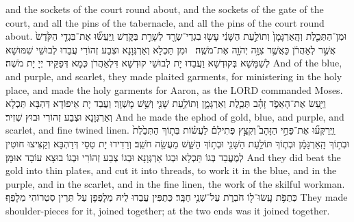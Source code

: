 {{and the sockets of the court round about, and the sockets of the gate of the court, and all the pins of the tabernacle, and all the pins of the court round about.}{}
\newperek
{}%
{וּמִן־הַתְּכֵ֤לֶת וְהָֽאַרְגָּמָן֙ וְתוֹלַ֣עַת הַשָּׁנִ֔י עָשׂ֥וּ בִגְדֵי־שְׂרָ֖ד לְשָׁרֵ֣ת בַּקֹּ֑דֶשׁ וַֽיַּעֲשׂ֞וּ אֶת־בִּגְדֵ֤י הַקֹּ֙דֶשׁ֙ אֲשֶׁ֣ר לְאַהֲרֹ֔ן כַּאֲשֶׁ֛ר צִוָּ֥ה יְהֹוָ֖ה אֶת־מֹשֶֽׁה׃ \petucha 
{}}
{וּמִן תַּכְלָא וְאַרְגְּוָנָא וּצְבַע זְהוֹרִי עֲבַדוּ לְבוּשֵׁי שִׁמּוּשָׁא לְשַׁמָּשָׁא בְּקוּדְשָׁא וַעֲבַדוּ יָת לְבוּשֵׁי קוּדְשָׁא דִּלְאַהֲרֹן כְּמָא דְּפַקֵּיד יְיָ יָת מֹשֶׁה׃}
{And of the blue, and purple, and scarlet, they made plaited garments, for ministering in the holy place, and made the holy garments for Aaron, as the LORD commanded Moses.}{}
{וַיַּ֖עַשׂ אֶת־הָאֵפֹ֑ד זָהָ֗ב תְּכֵ֧לֶת וְאַרְגָּמָ֛ן וְתוֹלַ֥עַת שָׁנִ֖י וְשֵׁ֥שׁ מׇשְׁזָֽר׃}
{וַעֲבַד יָת אֵיפוֹדָא דַּהְבָּא תַּכְלָא וְאַרְגְּוָנָא וּצְבַע זְהוֹרִי וּבוּץ שְׁזִיר׃}
{And he made the ephod of gold, blue, and purple, and scarlet, and fine twined linen.}{}
{וַֽיְרַקְּע֞וּ אֶת־פַּחֵ֣י הַזָּהָב֮ וְקִצֵּ֣ץ פְּתִילִם֒ לַעֲשׂ֗וֹת בְּת֤וֹךְ הַתְּכֵ֙לֶת֙ וּבְת֣וֹךְ הָֽאַרְגָּמָ֔ן וּבְת֛וֹךְ תּוֹלַ֥עַת הַשָּׁנִ֖י וּבְת֣וֹךְ הַשֵּׁ֑שׁ מַעֲשֵׂ֖ה חֹשֵֽׁב׃
}
{וְרַדִידוּ יָת טַסֵי דְּדַהְבָּא וְקַצִּיצוּ חוּטִין לְמֶעֱבַד בְּגוֹ תַּכְלָא וּבְגוֹ אַרְגְּוָנָא וּבְגוֹ צְבַע זְהוֹרִי וּבְגוֹ בוּצָא עוֹבָד אוּמָּן׃}
{And they did beat the gold into thin plates, and cut it into threads, to work it in the blue, and in the purple, and in the scarlet, and in the fine linen, the work of the skilful workman.}{}
{כְּתֵפֹ֥ת עָֽשׂוּ־ל֖וֹ חֹבְרֹ֑ת עַל־שְׁנֵ֥י  חֻבָּֽר׃}
{כַּתְפִּין עֲבַדוּ לֵיהּ מְלָפְפָן עַל תְּרֵין סִטְרוֹהִי מְלָפַף׃}
{They made shoulder-pieces for it, joined together; at the two ends was it joined together.}{}
}
